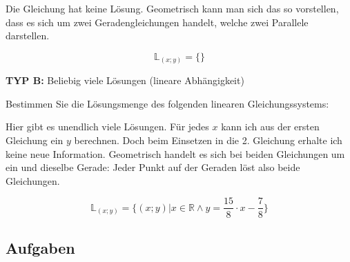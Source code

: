 Die Gleichung hat keine Lösung. Geometrisch kann man sich das so vorstellen, dass es sich um zwei Geradengleichungen handelt, welche zwei Parallele darstellen.

$$\mathbb{L}_{(x;y)} = \{\}$$

\textbf{TYP B:} Beliebig viele Lösungen (lineare Abhängigkeit)

Bestimmen Sie die Lösungsmenge des folgenden linearen Gleichungssystems:


Hier gibt es unendlich viele Lösungen. Für jedes $x$ kann ich aus der ersten Gleichung ein $y$ berechnen. Doch beim Einsetzen in die 2. Gleichung erhalte ich keine neue Information.
Geometrisch handelt es sich bei beiden Gleichungen um ein und dieselbe Gerade: Jeder Punkt auf der Geraden löst also beide Gleichungen.

$$\mathbb{L}_{(x;y)} = \{(x;y)| x\in \mathbb{R} \land{} y = \frac{15}{8} \cdot{} x - \frac78\}$$

\subsection*{Aufgaben}
\newpage
